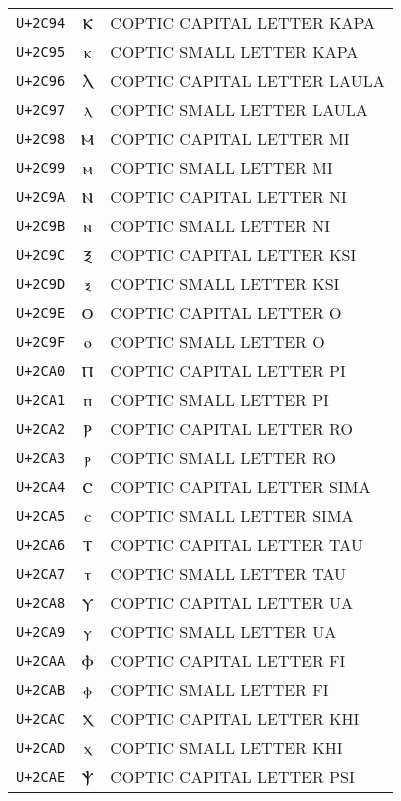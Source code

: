 \documentclass[10pt,a4paper]{article}
\newcommand{\coptic}[1]{{\copticfont #1}}
\begin{document}
\begin{longtable}{C C L}
\texttt{U+2C94} & \coptic{Ⲕ} & COPTIC CAPITAL LETTER KAPA \\
\texttt{U+2C95} & \coptic{ⲕ} & COPTIC SMALL LETTER KAPA \\
\texttt{U+2C96} & \coptic{Ⲗ} & COPTIC CAPITAL LETTER LAULA \\
\texttt{U+2C97} & \coptic{ⲗ} & COPTIC SMALL LETTER LAULA \\
\texttt{U+2C98} & \coptic{Ⲙ} & COPTIC CAPITAL LETTER MI \\
\texttt{U+2C99} & \coptic{ⲙ} & COPTIC SMALL LETTER MI \\
\texttt{U+2C9A} & \coptic{Ⲛ} & COPTIC CAPITAL LETTER NI \\
\texttt{U+2C9B} & \coptic{ⲛ} & COPTIC SMALL LETTER NI \\
\texttt{U+2C9C} & \coptic{Ⲝ} & COPTIC CAPITAL LETTER KSI \\
\texttt{U+2C9D} & \coptic{ⲝ} & COPTIC SMALL LETTER KSI \\
\texttt{U+2C9E} & \coptic{Ⲟ} & COPTIC CAPITAL LETTER O \\
\texttt{U+2C9F} & \coptic{ⲟ} & COPTIC SMALL LETTER O \\
\texttt{U+2CA0} & \coptic{Ⲡ} & COPTIC CAPITAL LETTER PI \\
\texttt{U+2CA1} & \coptic{ⲡ} & COPTIC SMALL LETTER PI \\
\texttt{U+2CA2} & \coptic{Ⲣ} & COPTIC CAPITAL LETTER RO \\
\texttt{U+2CA3} & \coptic{ⲣ} & COPTIC SMALL LETTER RO \\
\texttt{U+2CA4} & \coptic{Ⲥ} & COPTIC CAPITAL LETTER SIMA \\
\texttt{U+2CA5} & \coptic{ⲥ} & COPTIC SMALL LETTER SIMA \\
\texttt{U+2CA6} & \coptic{Ⲧ} & COPTIC CAPITAL LETTER TAU \\
\texttt{U+2CA7} & \coptic{ⲧ} & COPTIC SMALL LETTER TAU \\
\texttt{U+2CA8} & \coptic{Ⲩ} & COPTIC CAPITAL LETTER UA \\
\texttt{U+2CA9} & \coptic{ⲩ} & COPTIC SMALL LETTER UA \\
\texttt{U+2CAA} & \coptic{Ⲫ} & COPTIC CAPITAL LETTER FI \\
\texttt{U+2CAB} & \coptic{ⲫ} & COPTIC SMALL LETTER FI \\
\texttt{U+2CAC} & \coptic{Ⲭ} & COPTIC CAPITAL LETTER KHI \\
\texttt{U+2CAD} & \coptic{ⲭ} & COPTIC SMALL LETTER KHI \\
\texttt{U+2CAE} & \coptic{Ⲯ} & COPTIC CAPITAL LETTER PSI \\

\end{longtable}
\end{document}
